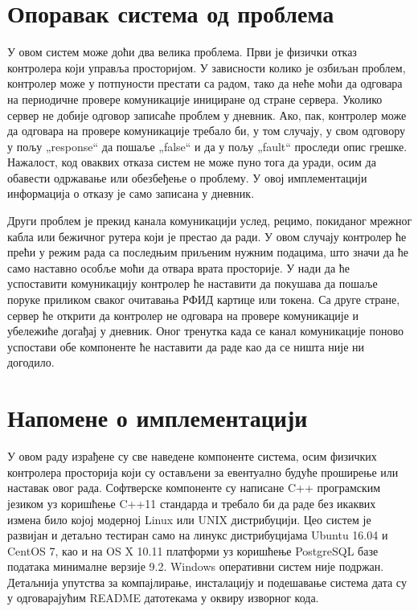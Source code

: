 \documentclass[a4paper, 12pt, diplomski]{etfcyr}
\def\quote#1{„#1“}
\begin{document}
		\section{Опоравак система од проблема}
			\begin{justify}
				У овом систем може доћи два велика проблема. Први је физички отказ контролера који управља просторијом. У зависности колико је озбиљан проблем, контролер може у потпуности престати са радом, тако да неће моћи да одговара на периодичне провере комуникације инициране од стране сервера. Уколико сервер не добије одговор записаће проблем у дневник. Ако, пак, контролер може да одговара на провере комуникације требало би, у том случају, у свом одговору у пољу \quote{response} да пошаље \quote{false} и да у пољу \quote{fault} проследи опис грешке. Нажалост, код оваквих отказа систем не може пуно тога да уради, осим да обавести одржавање или обезбеђење о проблему. У овој имплементацији информација о отказу је само записана у дневник.

				Други проблем је прекид канала комуникацији услед, рецимо, покиданог мрежног кабла или бежичног рутера који је престао да ради. У овом случају контролер ће прећи у режим рада са последњим приљеним нужним подацима, што значи да ће само наставно особље моћи да отвара врата просторије. У нади да ће успоставити комуникацију контролер ће наставити да покушава да пошаље поруке приликом сваког очитавања РФИД картице или токена. Са друге стране, сервер ће открити да контролер не одговара на провере комуникације и убележиће догађај у дневник. Оног тренутка када се канал комуникације поново успостави обе компоненте ће наставити да раде као да се ништа није ни догодило.
			\end{justify}

		\section{Напомене о имплементацији}
			\begin{justify}
				У овом раду израђене су све наведене компоненте система, осим физичких контролера просторија који су остављени за евентуално будуће проширење или наставак овог рада. Софтверске компоненте су написане C++ програмским језиком уз коришћење C++11 стандарда и требало би да раде без икаквих измена било којој модерној Linux или UNIX дистрибуцији. Цео систем је развијан и детаљно тестиран само на линукс дистрибуцијама Ubuntu 16.04 и CentOS 7, као и на OS X 10.11 платформи уз коришћење PostgreSQL базе података минималне верзије 9.2. Windows оперативни систем није подржан. Детаљнија упутства за компајлирање, инсталацију и подешавање система дата су у одговарајућим README датотекама у оквиру изворног кода.
			\end{justify}
\end{document}
